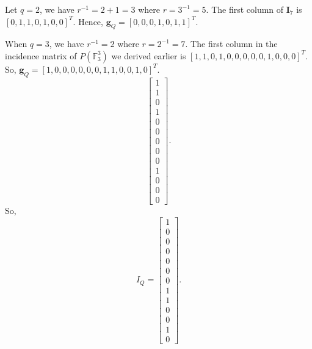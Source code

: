 \documentclass[journal,comsoc]{IEEEtran}
\begin{document}
Let $q=2$, we have $r^{-1} = 2+1 = 3$ where $r = 3^{-1} = 5$. The first column of $\mathbf{I}_7$ is $[0, 1, 1, 0, 1, 0, 0]^T$. \iffalse The first column of the incidence matrix of the Fano plane provided earlier is $[0, 1, 1, 0, 1, 0, 0]^T$.\fi Hence, $\mathbf{g}_Q = [ 0,0,0,1,0,1,1]^T$.
\iffalse
\[ \begin{bmatrix} 0 \\
1\\
1\\
0\\
1\\
0\\
0 \end{bmatrix}. \]
Hence, 
\[I_Q = \begin{bmatrix} 0\\
0\\
0\\
1\\
0\\
1\\
1 \end{bmatrix}. \]\fi
When $q = 3$, we have $r^{-1}=2$ where $r = 2^{-1} = 7$. The first column in the incidence matrix of $P(\mathbb{F}_3^3)$ we derived earlier is $[1,1,0,1,0,0,0,0,0,1,0,0,0]^T$. So, $\mathbf{g}_Q = [ 1,0,0,0,0,0,0,1,1,0,0,1,0]^T$.
\iffalse \[ \begin{bmatrix} 1\\
1\\
0\\
1\\
0\\
0\\
0\\
0\\
0\\
1\\
0\\
0\\
0 \end{bmatrix}. \]
So, 
\[I_Q = \begin{bmatrix} 1\\
0\\
0\\
0\\
0\\
0\\
0\\
1\\
1\\
0\\
0\\
1\\
0 \end{bmatrix}.\] 
\end{document}
